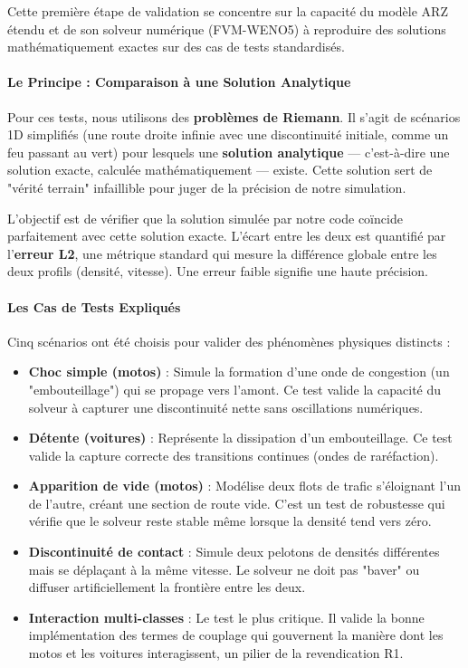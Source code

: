 Cette première étape de validation se concentre sur la capacité du modèle ARZ étendu et de son solveur numérique (FVM-WENO5) à reproduire des solutions mathématiquement exactes sur des cas de tests standardisés.

\paragraph{Le Principe : Comparaison à une Solution Analytique}

Pour ces tests, nous utilisons des \textbf{problèmes de Riemann}. Il s'agit de scénarios 1D simplifiés (une route droite infinie avec une discontinuité initiale, comme un feu passant au vert) pour lesquels une \textbf{solution analytique} — c'est-à-dire une solution exacte, calculée mathématiquement — existe. Cette solution sert de "vérité terrain" infaillible pour juger de la précision de notre simulation.

L'objectif est de vérifier que la solution simulée par notre code coïncide parfaitement avec cette solution exacte. L'écart entre les deux est quantifié par l'\textbf{erreur L2}, une métrique standard qui mesure la différence globale entre les deux profils (densité, vitesse). Une erreur faible signifie une haute précision.

\paragraph{Les Cas de Tests Expliqués}

Cinq scénarios ont été choisis pour valider des phénomènes physiques distincts :
\begin{itemize}
    \item \textbf{Choc simple (motos)} : Simule la formation d'une onde de congestion (un "embouteillage") qui se propage vers l'amont. Ce test valide la capacité du solveur à capturer une discontinuité nette sans oscillations numériques.
    \item \textbf{Détente (voitures)} : Représente la dissipation d'un embouteillage. Ce test valide la capture correcte des transitions continues (ondes de raréfaction).
    \item \textbf{Apparition de vide (motos)} : Modélise deux flots de trafic s'éloignant l'un de l'autre, créant une section de route vide. C'est un test de robustesse qui vérifie que le solveur reste stable même lorsque la densité tend vers zéro.
    \item \textbf{Discontinuité de contact} : Simule deux pelotons de densités différentes mais se déplaçant à la même vitesse. Le solveur ne doit pas "baver" ou diffuser artificiellement la frontière entre les deux.
    \item \textbf{Interaction multi-classes} : Le test le plus critique. Il valide la bonne implémentation des termes de couplage qui gouvernent la manière dont les motos et les voitures interagissent, un pilier de la revendication R1.
\end{itemize}

